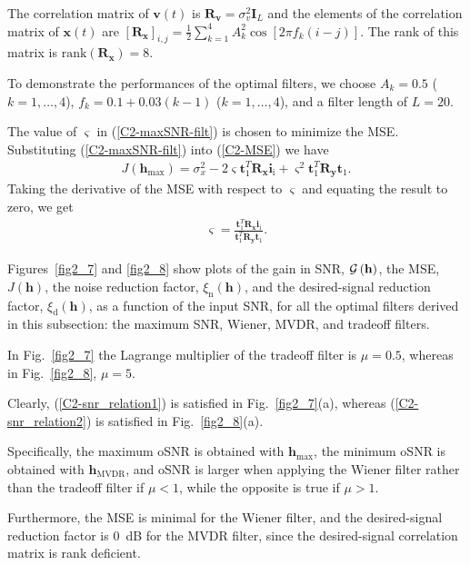 \documentclass[10pt,pdflatex,headrule,landscape]{beamer}
\begin{document}
\begin{frame}[allowframebreaks]


The correlation matrix of $\mathbf{v}(t)$ is $\mathbf{R}_{\mathbf{v}}=\sigma_v^2\mathbf{I}_L$ and the elements of the correlation matrix of $\mathbf{x}(t)$ are $\left[\mathbf{R}_{\mathbf{x}}\right]_{i,j}=\frac{1}{2}\sum_{k=1}^4 {A_k^2\cos\left[2\pi f_k(i-j)\right]}$. The rank of this matrix is $\mathrm{rank}\left(\mathbf{R}_{\mathbf{x}}\right)=8$.

To demonstrate the performances of the optimal filters, we choose $A_k=0.5$ ($k=1,\ldots,4$), $f_k=0.1+0.03(k-1)$  ($k=1,\ldots,4$), and a filter length of $L=20$.

The value of $\varsigma$ in (\ref{C2-maxSNR-filt}) is chosen to minimize the MSE. Substituting (\ref{C2-maxSNR-filt}) into (\ref{C2-MSE}) we have
\begin{eqnarray*}
 J\left( \mathbf{h}_{\mathrm{max}} \right) = \sigma_x^2 - 2\varsigma \mathbf{t}_1^T \mathbf{R}_{\mathbf{x}} \mathbf{i}_{\mathrm{i}}
 + \varsigma^2\mathbf{t}_1^T \mathbf{R}_{\mathbf{y}} \mathbf{t}_1 .
\end{eqnarray*}
Taking the derivative of the MSE with respect to $\varsigma$ and equating the result to zero, we get
\begin{eqnarray*}
 \varsigma=\frac{\mathbf{t}_1^T \mathbf{R}_{\mathbf{x}} \mathbf{i}_{\mathrm{i}}}{\mathbf{t}_1^T \mathbf{R}_{\mathbf{y}} \mathbf{t}_1} .
\end{eqnarray*}

Figures~\ref{fig2_7} and \ref{fig2_8} show plots of the gain in SNR, ${\cal G}\left(\mathbf{h}\right)$, the MSE, $J\left(\mathbf{h}\right)$, the noise reduction factor, $\xi_{\mathrm{n}}\left( \mathbf{h} \right)$, and the desired-signal reduction factor, $\xi_{\mathrm{d}}\left( \mathbf{h} \right)$, as a function of the input SNR, for all the optimal filters derived in this subsection: the maximum SNR, Wiener, MVDR, and tradeoff filters.

In Fig.~\ref{fig2_7} the Lagrange multiplier of the tradeoff filter is $\mu=0.5$, whereas in Fig.~\ref{fig2_8}, $\mu=5$.

Clearly, (\ref{C2-snr_relation1}) is satisfied in Fig.~\ref{fig2_7}(a), whereas (\ref{C2-snr_relation2}) is satisfied in Fig.~\ref{fig2_8}(a).

\end{frame}
\begin{frame}

Specifically, the maximum oSNR is obtained with $\mathbf{h}_{\mathrm{max}}$, the minimum oSNR is obtained with $\mathbf{h}_{\mathrm{MVDR}}$, and oSNR is larger when applying the Wiener filter rather than the tradeoff filter if $\mu<1$, while the opposite is true if $\mu>1$.

Furthermore, the MSE is minimal for the Wiener filter, and the desired-signal reduction factor is $0$~dB for the MVDR filter, since the desired-signal correlation matrix is rank deficient.

\end{frame}
\end{document}

